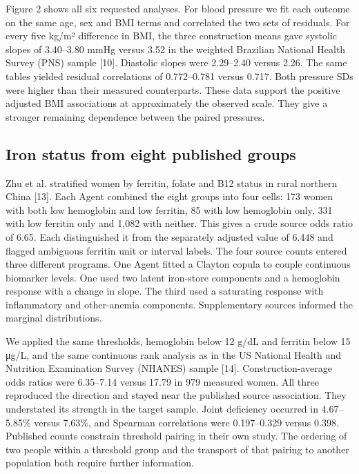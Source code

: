 \documentclass[sigconf,anonymous,nonacm]{acmart}
\begin{document}
Figure 2 shows all six requested analyses. For blood pressure we fit each outcome on the same age, sex and BMI terms and correlated the two sets of residuals. For every five kg/\allowbreak{}m² difference in BMI, the three construction means gave systolic slopes of 3.40–\allowbreak{}3.80 mmHg versus 3.52 in the weighted Brazilian National Health Survey (PNS) sample [10]. Diastolic slopes were 2.29–\allowbreak{}2.40 versus 2.26. The same tables yielded residual correlations of 0.772–\allowbreak{}0.781 versus 0.717. Both pressure SDs were higher than their measured counterparts. These data support the positive adjusted BMI associations at approximately the observed scale. They give a stronger remaining dependence between the paired pressures.


\subsection{Iron status from eight published groups}

Zhu et al. stratified women by ferritin, folate and B12 status in rural northern China [13]. Each Agent combined the eight groups into four cells: 173 women with both low hemoglobin and low ferritin, 85 with low hemoglobin only, 331 with low ferritin only and 1,082 with neither. This gives a crude source odds ratio of 6.65. Each distinguished it from the separately adjusted value of 6.448 and flagged ambiguous ferritin unit or interval labels. The four source counts entered three different programs. One Agent fitted a Clayton copula to couple continuous biomarker levels. One used two latent iron-store components and a hemoglobin response with a change in slope. The third used a saturating response with inflammatory and other-anemia components. Supplementary sources informed the marginal distributions.


We applied the same thresholds, hemoglobin below 12 g/\allowbreak{}dL and ferritin below 15 μg/\allowbreak{}L, and the same continuous rank analysis as in the US National Health and Nutrition Examination Survey (NHANES) sample [14]. Construction-average odds ratios were 6.35–\allowbreak{}7.14 versus 17.79 in 979 measured women. All three reproduced the direction and stayed near the published source association. They understated its strength in the target sample. Joint deficiency occurred in 4.67–\allowbreak{}5.85\% versus 7.63\%, and Spearman correlations were 0.197–\allowbreak{}0.329 versus 0.398. Published counts constrain threshold pairing in their own study. The ordering of two people within a threshold group and the transport of that pairing to another population both require further information.
\end{document}
